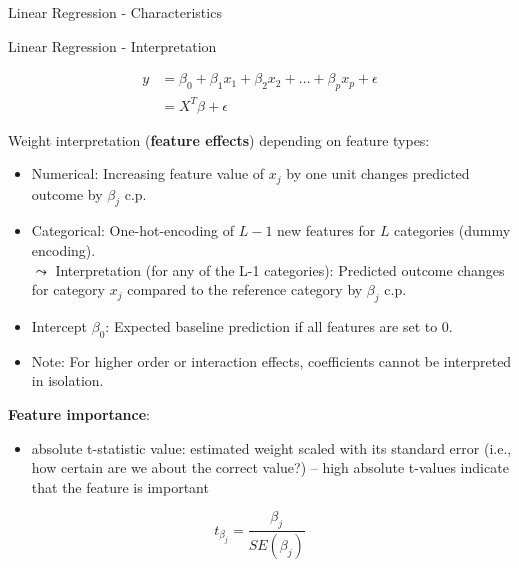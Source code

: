 \documentclass[11pt,compress,t,notes=noshow, aspectratio=169, xcolor=table]{beamer}
\begin{document}
\begin{frame}[c]{Linear Regression - Characteristics}
\begin{itemize}
    \end{itemize}

\end{frame}


\begin{frame}[c]{Linear Regression - Interpretation}

\begin{align*}
y &= \beta_0 + \beta_1 x_1 + \beta_2 x_2 + \dots + \beta_p x_p + \epsilon \\
 &= X^T\beta + \epsilon
\end{align*}

    Weight interpretation (\textbf{feature effects}) depending on feature types:
    \begin{itemize}
        \item Numerical: Increasing feature value of $x_j$ by one unit changes predicted outcome by $\beta_j$ c.p.
        \item Categorical: One-hot-encoding of $L-1$ new features for $L$ categories (dummy encoding). \\
        $\leadsto$ Interpretation (for any of the L-1 categories): Predicted outcome changes for category $x_j$ compared to the reference category by $\beta_j$ c.p.
        \item Intercept $\beta_0$: Expected baseline prediction if all features are set to 0. %
        \item Note: For higher order or interaction effects, coefficients cannot be interpreted in isolation.
    \end{itemize}	
    \pause
    \textbf{Feature importance}:
    \begin{itemize}
        \item absolute t-statistic value: estimated weight scaled with its standard error (i.e., how certain are we about the correct value?) -- high absolute t-values indicate that the feature is important
    \end{itemize}
    $$t_{\beta_j} = \frac{\beta_j}{SE(\beta_j)} $$
\end{frame}
\end{document}
